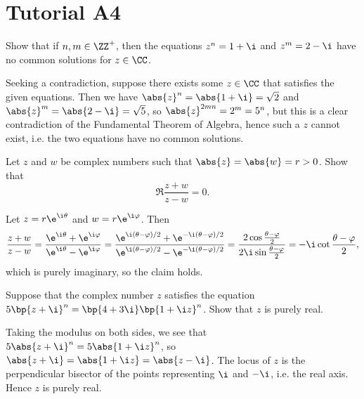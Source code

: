 \section{Tutorial A4}

\begin{problem}
    Show that if $n, m \in \ZZ^+$, then the equations $z^n = 1 + \i$ and $z^m = 2 - \i$ have no common solutions for $z \in \CC$.
\end{problem}
\begin{solution}
    Seeking a contradiction, suppose there exists some $z \in \CC$ that satisfies the given equations. Then we have $\abs{z}^n = \abs{1 + \i} = \sqrt{2}$ and $\abs{z}^m = \abs{2 - \i} = \sqrt{5}$, so $\abs{z}^{2mn} = 2^m = 5^n$, but this is a clear contradiction of the Fundamental Theorem of Algebra, hence such a $z$ cannot exist, i.e. the two equations have no common solutions.
\end{solution}

\begin{problem}
    Let $z$ and $w$ be complex numbers such that $\abs{z} = \abs{w} = r > 0$. Show that \[\Re{\frac{z+w}{z-w}} = 0.\]
\end{problem}
\begin{solution}
    Let $z = r \e^{\i \t}$ and $w = r \e^{\i \vf}$. Then \[\frac{z + w}{z - w} = \frac{\e^{\i \t} + \e^{\i \vf}}{\e^{\i \t} - \e^{\i \vf}} = \frac{\e^{\i (\t - \vf)/2} + \e^{-\i (\t - \vf)/2}}{\e^{\i (\t - \vf)/2} - \e^{-\i (\t - \vf)/2}} = \frac{2\cos{\frac{\t - \vf}2}}{2\i \sin{\frac{\t - \vf}2}} = -\i \cot{\frac{\t - \vf}{2}},\] which is purely imaginary, so the claim holds.
\end{solution}

\begin{problem}
    Suppose that the complex number $z$ satisfies the equation $5\bp{z + \i}^n = \bp{4 + 3\i} \bp{1 + \i z}^n$. Show that $z$ is purely real.
\end{problem}
\begin{solution}
    Taking the modulus on both sides, we see that $5 \abs{z + \i}^n = 5 \abs{1 + \i z}^n$, so $\abs{z + \i} = \abs{1 + \i z} = \abs{z - \i}$. The locus of $z$ is the perpendicular bisector of the points representing $\i$ and $-\i$, i.e. the real axis. Hence $z$ is purely real.
\end{solution}

